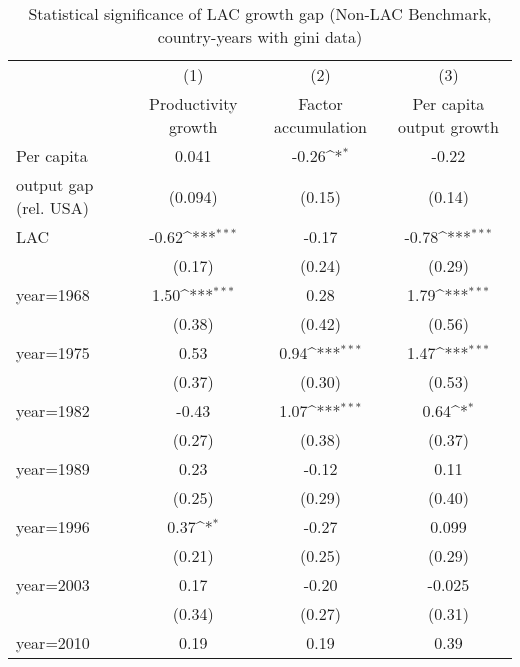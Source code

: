 \begin{table}[htbp]\centering
\def\sym#1{\ifmmode^{#1}\else\(^{#1}\)\fi}
\caption{Statistical significance of LAC growth gap (Non-LAC Benchmark, country-years with gini data)}
\begin{tabular}{l*{3}{c}}
\toprule
                &\multicolumn{1}{c}{(1)}&\multicolumn{1}{c}{(2)}&\multicolumn{1}{c}{(3)}\\
                &\multicolumn{1}{c}{Productivity growth}&\multicolumn{1}{c}{Factor accumulation}&\multicolumn{1}{c}{Per capita output growth}\\
\midrule
Per capita      &    0.041         &    -0.26\sym{*}  &    -0.22         \\
output gap (rel. USA)&  (0.094)         &   (0.15)         &   (0.14)         \\
\addlinespace
LAC             &    -0.62\sym{***}&    -0.17         &    -0.78\sym{***}\\
                &   (0.17)         &   (0.24)         &   (0.29)         \\
\addlinespace
year=1968       &     1.50\sym{***}&     0.28         &     1.79\sym{***}\\
                &   (0.38)         &   (0.42)         &   (0.56)         \\
\addlinespace
year=1975       &     0.53         &     0.94\sym{***}&     1.47\sym{***}\\
                &   (0.37)         &   (0.30)         &   (0.53)         \\
\addlinespace
year=1982       &    -0.43         &     1.07\sym{***}&     0.64\sym{*}  \\
                &   (0.27)         &   (0.38)         &   (0.37)         \\
\addlinespace
year=1989       &     0.23         &    -0.12         &     0.11         \\
                &   (0.25)         &   (0.29)         &   (0.40)         \\
\addlinespace
year=1996       &     0.37\sym{*}  &    -0.27         &    0.099         \\
                &   (0.21)         &   (0.25)         &   (0.29)         \\
\addlinespace
year=2003       &     0.17         &    -0.20         &   -0.025         \\
                &   (0.34)         &   (0.27)         &   (0.31)         \\
\addlinespace
year=2010       &     0.19         &     0.19         &     0.39         \\

\end{tabular}
\end{table}
